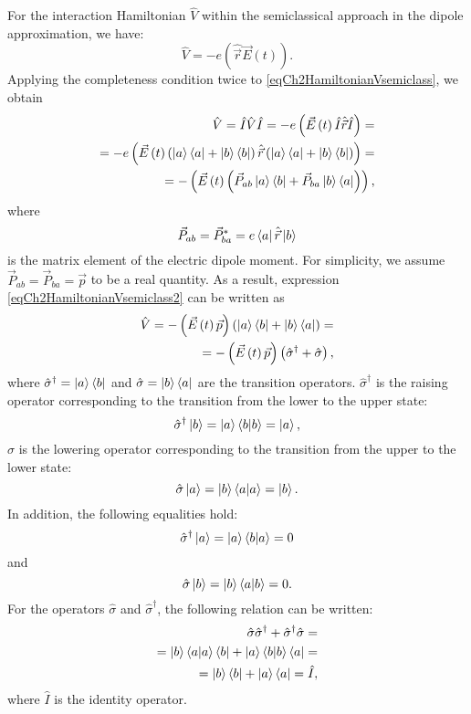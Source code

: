 For the interaction Hamiltonian $\hat{V}$ within the semiclassical
approach in the dipole approximation, we have:
\begin{equation}
\hat{V} = - e \left(\hat{\vec{r}} \vec{E}\left(t\right)\right).
\label{eqCh2HamiltonianVsemiclass}
\end{equation}
Applying the completeness condition twice to \eqref{eqCh2HamiltonianVsemiclass}, we obtain
\begin{eqnarray}
\hat{V} = \hat{I}\hat{V}\hat{I} = - e \left(\vec{E}\left(t\right)
\hat{I}\hat{\vec{r}}\hat{I}\right) = 
\nonumber \\
= - e \left(\vec{E}\left(t\right) 
\left(\ket{a}\bra{a} +
  \ket{b}\bra{b}\right)\hat{\vec{r}}
\left(\ket{a}\bra{a} +
  \ket{b}\bra{b}\right)\right) = 
\nonumber \\
= - \left(\vec{E}\left(t\right)
  \left(\vec{P}_{ab}\ket{a}\bra{b} +
    \vec{P}_{ba}\ket{b}\bra{a}\right)\right),
\label{eqCh2HamiltonianVsemiclass2}
\end{eqnarray}
where
\[
\vec{P}_{ab} = \vec{P}_{ba}^{*} = e \bra{a}\hat{\vec{r}}\ket{b}
\]
is the matrix element of the electric dipole moment.
For simplicity, we assume $\vec{P}_{ab} = \vec{P}_{ba} = \vec{p}$ to be a real quantity. As a result, expression
\eqref{eqCh2HamiltonianVsemiclass2} can be written as
\begin{eqnarray}
\hat{V} 
= - \left(\vec{E}\left(t\right)\vec{p}\right)
\left(
  \ket{a}\bra{b} +
  \ket{b}\bra{a}\right) = 
\nonumber \\
= - \left(\vec{E}\left(t\right)\vec{p}\right) \left(\hat{\sigma}^{\dag} + \hat{\sigma}\right),
\label{eqCh2HamiltonianVsemiclass3}
\end{eqnarray}
where  $\hat{\sigma}^{\dag} = \ket{a}\bra{b}$ and 
$\hat{\sigma} = \ket{b}\bra{a}$ 
are the transition operators. 
$\hat{\sigma}^{\dag}$ is the raising operator corresponding to the transition from the lower to the upper state:
\[
\hat{\sigma}^{\dag} \ket{b} = 
\ket{a}\bra{b}\ket{b} = 
\ket{a},
\]
$\hat{\sigma}$
is the lowering operator corresponding to the transition from the upper to the lower state:
\[
\hat{\sigma}
\ket{a} = 
\ket{b}\bra{a}\ket{a} = 
\ket{b}.
\]
In addition, the following equalities hold:
\[
\hat{\sigma}^{\dag} \ket{a} = 
\ket{a}\bra{b}\ket{a} = 
0
\]
and
\[
\hat{\sigma}
\ket{b} = 
\ket{b}\bra{a}\ket{b} = 
0.
\]
For the operators $\hat{\sigma}$ and $\hat{\sigma}^{\dag}$, the following relation can be written: 
\begin{eqnarray}
\hat{\sigma}\hat{\sigma}^{\dag} + \hat{\sigma}^{\dag}\hat{\sigma} =
\nonumber \\
= \ket{b}\bra{a}\ket{a}\bra{b} + 
 \ket{a}\bra{b}\ket{b}\bra{a} = 
\nonumber \\
= \ket{b}\bra{b} + \ket{a}\bra{a} = \hat{I}, 
\label{eqCh2_task1}
\end{eqnarray}
where $\hat{I}$ is the identity operator.

